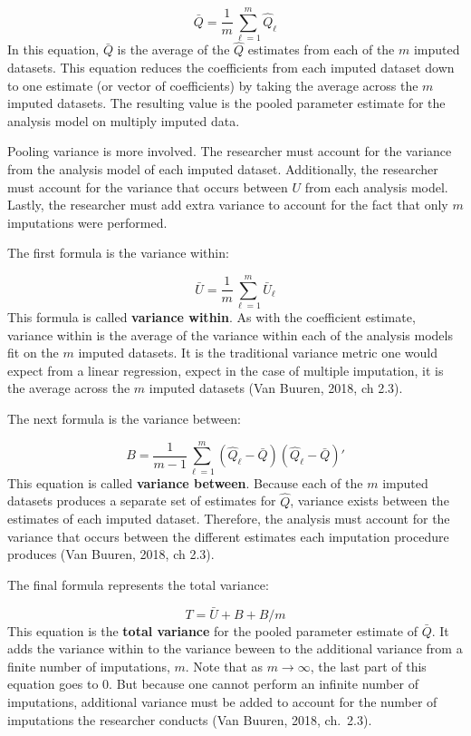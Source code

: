\documentclass[12pt,oneside]{chicagocapstone}
\begin{document}
\[\bar Q = \frac{1}{m}\sum_{\ell=1}^m \hat Q_\ell\] In this equation,
\(\bar Q\) is the average of the \(\hat Q\) estimates from each of the
\(m\) imputed datasets. This equation reduces the coefficients from each
imputed dataset down to one estimate (or vector of coefficients) by
taking the average across the \(m\) imputed datasets. The resulting
value is the pooled parameter estimate for the analysis model on
multiply imputed data.

Pooling variance is more involved. The researcher must account for the
variance from the analysis model of each imputed dataset. Additionally,
the researcher must account for the variance that occurs between \(U\)
from each analysis model. Lastly, the researcher must add extra variance
to account for the fact that only \(m\) imputations were performed.

The first formula is the variance within:

\[ \bar U = \frac{1}{m}\sum_{\ell=1}^m \bar U_\ell\] This formula is
called \textbf{variance within}. As with the coefficient estimate,
variance within is the average of the variance within each of the
analysis models fit on the \(m\) imputed datasets. It is the traditional
variance metric one would expect from a linear regression, expect in the
case of multiple imputation, it is the average across the \(m\) imputed
datasets (Van Buuren, 2018, ch 2.3).

The next formula is the variance between:

\[B = \frac{1}{m-1}\sum_{\ell=1}^m (\hat Q_\ell-\bar Q)(\hat Q_\ell-\bar Q)'\]
This equation is called \textbf{variance between}. Because each of the
\(m\) imputed datasets produces a separate set of estimates for
\(\hat Q\), variance exists between the estimates of each imputed
dataset. Therefore, the analysis must account for the variance that
occurs between the different estimates each imputation procedure
produces (Van Buuren, 2018, ch 2.3).

The final formula represents the total variance:

\[T = \bar U + B + B/m\] This equation is the \textbf{total variance}
for the pooled parameter estimate of \(\bar Q\). It adds the variance
within to the variance beween to the additional variance from a finite
number of imputations, \(m\). Note that as \(m \rightarrow \infty\), the
last part of this equation goes to \(0\). But because one cannot perform
an infinite number of imputations, additional variance must be added to
account for the number of imputations the researcher conducts (Van
Buuren, 2018, ch.~2.3).
\end{document}
